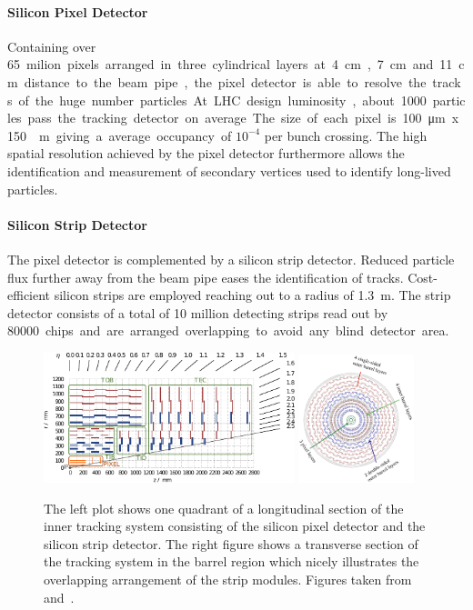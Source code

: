\paragraph{Silicon Pixel Detector} Containing over \SI{65} milion pixels
arranged in three cylindrical layers at \SI{4}{\centi\meter},
\SI{7}{\centi\meter} and \SI{11}{\centi\meter} distance to the beam pipe, the
pixel detector is able to resolve the tracks of the huge number particles. At
LHC design luminosity, about 1000 particles pass the tracking detector on
average. The size of each pixel is \SI{100}{\micro \meter} x \SI{150}{\micro
\meter} giving a average occupancy of $10^{-4}$ per bunch crossing.  The high
spatial resolution achieved by the pixel detector furthermore allows the
identification and measurement of secondary vertices used to identify long-lived
particles.

\paragraph{Silicon Strip Detector} The pixel detector is complemented by a silicon
strip detector. Reduced particle flux further away from the beam pipe eases the identification
of tracks. Cost-efficient silicon strips are employed reaching out to
a radius of \SI{1.3}{\meter}. The strip detector consists of a total of 10 million
detecting strips read out by \SI{80000} chips and are arranged overlapping to
avoid any blind detector area.

\begin{figure}[htp]
    \centering
    \includegraphics[width=0.65\textwidth]{figures/cms_detector/tracker.pdf}\hfill
    \includegraphics[width=0.3\textwidth]{figures/cms_detector/tracking_sytem_barrel_slice.png}
    \caption[Inner Tracking System]{The left plot shows one quadrant of a
        longitudinal section of the inner tracking system consisting of the
        silicon pixel detector and the silicon strip detector. The right figure shows a
        transverse section of the tracking system in the barrel region which
        nicely illustrates the overlapping arrangement of the strip modules. Figures taken
        from~\cite{Berger:2014aca} and~\cite{cmsweb:innertracker}.}
    \label{fig:cms:inner_tracking}
\end{figure}

